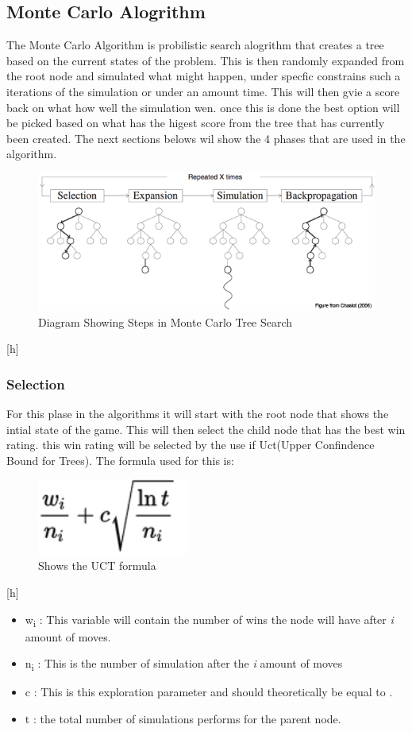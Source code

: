 \subsection {Monte Carlo Alogrithm}
The Monte Carlo Algorithm is probilistic search alogrithm that creates a tree based on the current states of the problem. This is then randomly expanded from the root node and simulated what might happen, under specfic constrains such a iterations of the simulation or under an amount time. This will then gvie a score back on what how well the simulation wen. once this is done the best option will be picked based on what has the higest score from the tree that has currently been created.  The next sections belows wil show the 4 phases that are used in the algorithm.
\begin{figure}[h]
\centering
\includegraphics[width=15cm]{mcts-algorithm-1a}
\caption{Diagram Showing Steps in Monte Carlo Tree Search}
\end{figure}[h]
\subsubsection{Selection}
For this plase in the algorithms it will start with the root node that shows the intial state of the game. This will then select the child node that has the best win rating. this win rating will be selected by the use if Uct(Upper Confindence Bound for Trees). The formula used for this is:
\begin{figure}[h]
\centering
\includegraphics[width=5cm]{formula}
\caption{Shows the UCT formula}
\end{figure}[h]

\begin{itemize}
\item w\textsubscript{i} : This variable will contain the number of wins the node will have after \textit{i} amount of moves.
\item n\textsubscript{i} : This is the number of simulation after the \textit{i} amount of moves
\item c : This is this exploration parameter and should theoretically be equal to .
\item t : the total number of simulations performs for the parent node.
\cite{mctswithcode}
\end{itemize}
